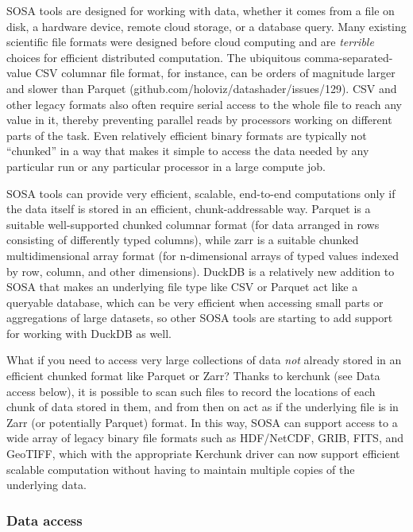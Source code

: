 SOSA tools are designed for working with data, whether it comes from a file on disk, a hardware device, remote cloud storage, or a database query. Many existing scientific file formats were designed before cloud computing and are \emph{terrible} choices for efficient distributed computation. The ubiquitous comma-separated-value CSV columnar file format, for instance, can be orders of magnitude larger and slower than Parquet (github.com/holoviz/datashader/issues/129). CSV and other legacy formats also often require serial access to the whole file to reach any value in it, thereby preventing parallel reads by processors working on different parts of the task. Even relatively efficient binary formats are typically not ``chunked'' in a way that makes it simple to access the data needed by any particular run or any particular processor in a large compute job.

SOSA tools can provide very efficient, scalable, end-to-end computations only if the data itself is stored in an efficient, chunk-addressable way. Parquet is a suitable well-supported chunked columnar format (for data arranged in rows consisting of differently typed columns), while zarr is a suitable chunked multidimensional array format (for n-dimensional arrays of typed values indexed by row, column, and other dimensions). DuckDB is a relatively new addition to SOSA that makes an underlying file type like CSV or Parquet act like a queryable database, which can be very efficient when accessing small parts or aggregations of large datasets, so other SOSA tools are starting to add support for working with DuckDB as well.

What if you need to access very large collections of data \emph{not} already stored in an efficient chunked format like Parquet or Zarr? Thanks to kerchunk (see Data access below), it is possible to scan such files to record the locations of each chunk of data stored in them, and from then on act as if the underlying file is in Zarr (or potentially Parquet) format. In this way, SOSA can support access to a wide array of legacy binary file formats such as HDF/NetCDF, GRIB, FITS, and GeoTIFF, which with the appropriate Kerchunk driver can now support efficient scalable computation without having to maintain multiple copies of the underlying data.

\subsubsection{Data access}

